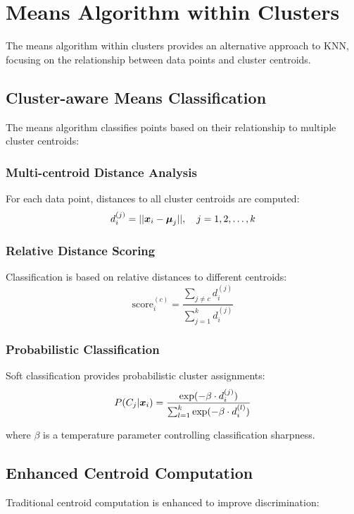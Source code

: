 \section{Means Algorithm within Clusters}
The means algorithm within clusters provides an alternative approach to KNN, focusing on the relationship between data points and cluster centroids.

\subsection{Cluster-aware Means Classification}
The means algorithm classifies points based on their relationship to multiple cluster centroids:

\subsubsection{Multi-centroid Distance Analysis}
For each data point, distances to all cluster centroids are computed:
\begin{equation}
d_i^{(j)} = ||\boldsymbol{x}_i - \boldsymbol{\mu}_j||, \quad j = 1, 2, \ldots, k
\end{equation}

\subsubsection{Relative Distance Scoring}
Classification is based on relative distances to different centroids:
\begin{equation}
\text{score}_i^{(c)} = \frac{\sum_{j \neq c} d_i^{(j)}}{\sum_{j=1}^{k} d_i^{(j)}}
\end{equation}

\subsubsection{Probabilistic Classification}
Soft classification provides probabilistic cluster assignments:
\begin{equation}
P(C_j|\boldsymbol{x}_i) = \frac{\exp(-\beta \cdot d_i^{(j)})}{\sum_{l=1}^{k} \exp(-\beta \cdot d_i^{(l)})}
\end{equation}

where $\beta$ is a temperature parameter controlling classification sharpness.

\subsection{Enhanced Centroid Computation}
Traditional centroid computation is enhanced to improve discrimination:


